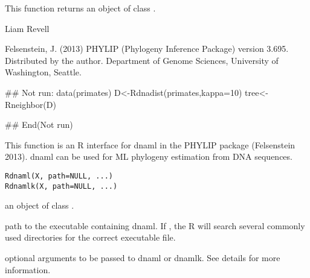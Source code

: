 \documentclass[a4paper]{book}
\begin{document}
%
\begin{Value}
This function returns an object of class .
\end{Value}
%
\begin{Author}\relax
Liam Revell 
\end{Author}
%
\begin{References}\relax
Felsenstein, J. (2013) PHYLIP (Phylogeny Inference Package) version 3.695. Distributed by the author. Department of Genome Sciences, University of Washington, Seattle.
\end{References}
%
\begin{SeeAlso}\relax
{}
\end{SeeAlso}
%
\begin{Examples}
\begin{ExampleCode}
## Not run: 
data(primates)
D<-Rdnadist(primates,kappa=10)
tree<-Rneighbor(D)

## End(Not run)
\end{ExampleCode}
\end{Examples}
%
\begin{Description}\relax
This function is an R interface for dnaml in the PHYLIP package (Felsenstein 2013). dnaml can be used for ML phylogeny estimation from DNA sequences.
\end{Description}
%
\begin{Usage}
\begin{verbatim}
Rdnaml(X, path=NULL, ...)
Rdnamlk(X, path=NULL, ...)
\end{verbatim}
\end{Usage}
%
\begin{Arguments}
\begin{ldescription}
\item[\code{X}] an object of class .
\item[\code{path}] path to the executable containing dnaml. If , the R will search several commonly used directories for the correct executable file.
\item[\code{...}] optional arguments to be passed to dnaml or dnamlk. See details for more information.
\end{ldescription}
\end{Arguments}
%
\end{document}
